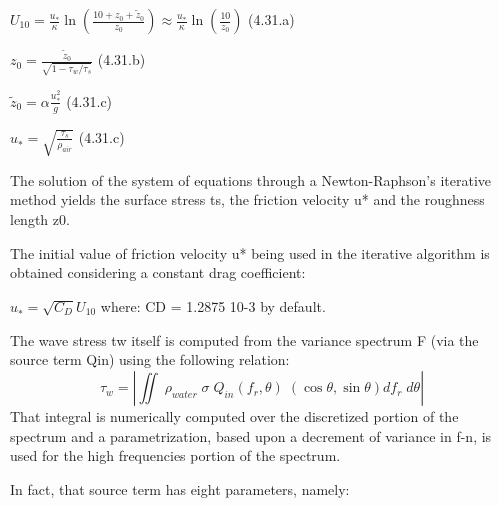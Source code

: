 $U_{10} =\frac{u_{*} }{\kappa } \ln \left(\frac{10+z_{0} +\tilde{z}_{0} }{z_{0} } \right)\approx \frac{u_{*} }{\kappa } \ln \left(\frac{10}{z_{0} } \right)$ (4.31.a)

$z_{0} =\frac{\tilde{z}_{0} }{\sqrt{1-\tau _{w} /\tau _{s} } } $ (4.31.b)

$\tilde{z}_{0} =\alpha \frac{u_{*}^{2} }{g} $ (4.31.c)

$u_{*}^{} =\sqrt{\frac{\tau _{s} }{\rho _{air} } } $ (4.31.c)

 The solution of the system of equations through a Newton-Raphson's iterative method yields the surface stress ts, the friction velocity u* and the roughness length z0.

The initial value of friction velocity u* being used in the iterative algorithm is obtained considering a constant drag coefficient:

$u_{*}^{} =\sqrt{C_{D} } U_{10} $ where: CD = 1.2875 10-3 by default.

 The wave stress tw itself is computed from the variance spectrum F (via the source term Qin) using the following relation:
\begin{equation} \label{GrindEQ__4_32_}
\tau _{w} =\left|\iint \;  \rho _{water} \; \sigma \; Q_{in} (f_{r} ,\theta )\; \left(\cos \theta ,\sin \theta \right)df_{r} \; d\theta \right|
\end{equation}
That integral is numerically computed over the discretized portion of the spectrum and a parametrization, based upon a decrement of variance in f-n, is used for the high frequencies portion of the spectrum.

In fact, that source term has eight parameters, namely:


